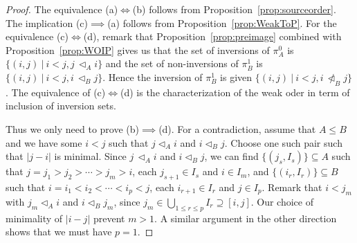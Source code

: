 \documentclass[reqno]{amsart}
\theoremstyle{definition}
\newcommand{\less}{\vartriangleleft} %
\begin{document}
\begin{proof} The equivalence (a)$\iff$(b) follows from Proposition~\ref{prop:sourceorder}. The implication (c)$\implies$(a) follows from  Proposition~\ref{prop:WeakToP}.
For the equivalence (c)$\iff$(d), remark that Proposition~\ref{prop:preimage} combined with Proposition~\ref{prop:WOIP} gives us that the set of inversions of $\pi^0_A$
is $\big\{(i,j)\ |\  i<j, j\,\less_Ai \big\}$ and the set of non-inversions of $\pi^1_B$ is  $\big\{(i,j)\ |\  i<j, i\,\less_B j \big\}$. Hence the inversion of $\pi^1_B$ is  given $\big\{(i,j)\ |\  i<j, i\,\not\less_B j \big\}$.
The equivalence of (c)$\iff$(d) is the characterization of the weak oder in term of inclusion of inversion sets.

Thus we only need to prove (b)$\implies$(d). For a contradiction, assume that $A\le B$ and we have some $i<j$ such that $j\less_Ai$ and  $i \less_B j$. Choose one such pair such that $|j-i|$ is minimal.
Since $j\,\less_A i$ and $i \less_B j$, we can find
$\{(j_s,I_{s})\}\subseteq A$ such that $j=j_1>j_2>\cdots>j_m>i$, each $j_{s+1}\in I_s$ and $i\in I_m$, and 
$\{(i_r,I_{r})\}\subseteq B$ such that $i=i_1<i_2<\cdots<i_p<j$, each $i_{r+1}\in I_r$ and $j\in I_p$. Remark that $i<j_m$ with $j_m\less_A i$ and $i\less_B j_m$, since $j_m\in \bigcup_{1\le r\le p}I_r\supseteq [i,j]$.
Our choice of minimality of $|i-j|$ prevent $m>1$. A similar argument in the other direction shows that we must have $p=1$. 


\end{proof}
\end{document}
